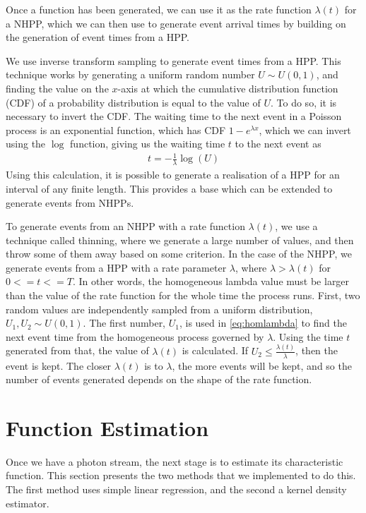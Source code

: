 \documentclass[a4paper,11pt,twoside]{article}
\begin{document}
   Once a function has been generated, we can use it as the rate function
   $\lambda(t)$ for a NHPP, which we can then use to generate event arrival
   times by building on the generation of event times from a HPP.

   We use inverse transform sampling to generate event times from a HPP. This
   technique works by generating a uniform random number $U\sim U(0,1)$, and
   finding the value on the $x$-axis at which the cumulative distribution
   function (CDF) of a probability distribution is equal to the value of $U$. To
   do so, it is necessary to invert the CDF. The waiting time to the next event
   in a Poisson process is an exponential function, which has CDF $1-e^{\lambda
   x}$, which we can invert using the $\log$ function, giving us the
   waiting time $t$ to the next event as \cite{1998art}
   \begin{align}\label{eq:homlambda}
   t=-\frac{1}{\lambda}\log(U)
   \end{align}
   Using this calculation, it is possible to generate a realisation of a HPP for
   an interval of any finite length. This provides a base which can be extended
   to generate events from NHPPs.
   
   To generate events from an NHPP with a rate function $\lambda(t)$, we use a
   technique called thinning, where we generate a large number of values, and
   then throw some of them away based on some criterion. In the case of the
   NHPP, we generate events from a HPP with a rate parameter $\lambda$, where
   $\lambda>\lambda(t)$ for $0<=t<=T$. In other words, the homogeneous lambda
   value must be larger than the value of the rate function for the whole time
   the process runs. First, two random values are independently sampled from a
   uniform distribution, $U_1,U_2\sim U(0,1)$. The first number, $U_1$, is used
   in \eqref{eq:homlambda} to find the next event time from the homogeneous
   process governed by $\lambda$. Using the time $t$ generated from that, the
   value of $\lambda(t)$ is calculated. If $U_2\leq\frac{\lambda(t)}{\lambda}$,
   then the event is kept. The closer $\lambda(t)$ is to $\lambda$, the more
   events will be kept, and so the number of events generated depends on the
   shape of the rate function.
\section{Function Estimation}
\label{sec-4}

  Once we have a photon stream, the next stage is to estimate its characteristic
  function. This section presents the two methods that we implemented to do
  this. The first method uses simple linear regression, and the second a kernel
  density estimator.
\end{document}
